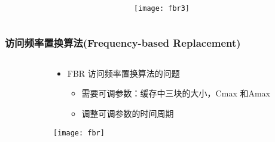 \begin{frame}[plain]
	\frametitle{ }
	\begin{columns}
		\begin{column}{.0\textwidth}
			\centering
		\end{column}
		
		\begin{column}{1.0\textwidth}
			
%				
			
			\texttt{[image: fbr3]}
		\end{column}
		
		
	\end{columns}
\end{frame}



\begin{frame}[plain]
	\frametitle{访问频率置换算法(Frequency-based Replacement)}
	\begin{columns}
		\begin{column}{.0\textwidth}
			\centering
		\end{column}
		
		\begin{column}{1.0\textwidth}
			
			\begin{itemize}
				\item FBR 访问频率置换算法的问题
				
					\begin{itemize}
					\item 需要可调参数：缓存中三块的大小，Cmax 和Amax
					\item 调整可调参数的时间周期
				\end{itemize}
			\end{itemize}
			\centering
			\texttt{[image: fbr]}
		\end{column}
		
		
	\end{columns}
\end{frame}







